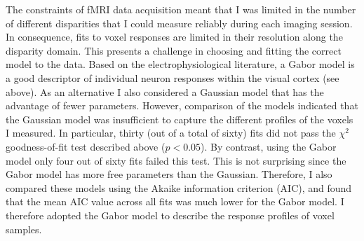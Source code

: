 The constraints of fMRI data acquisition meant that I was limited in the number of different disparities that I could measure reliably during each imaging session. In consequence, fits to voxel responses are limited in their resolution along the disparity domain. This presents a challenge in choosing and fitting the correct model to the data. Based on the electrophysiological literature, a Gabor model is a good descriptor of individual neuron responses within the visual cortex (see above). As an alternative I also considered a Gaussian model that has the advantage of fewer parameters. However, comparison of the models indicated that the Gaussian model was insufficient to capture the different profiles of the voxels I measured. In particular, thirty (out of a total of sixty) fits did not pass the $\chi^2$ goodness-of-fit test described above ($p<0.05$). By contrast, using the Gabor model only four out of sixty fits failed this test. This is not surprising since the Gabor model has more free parameters than the Gaussian. Therefore, I also compared these models using the Akaike information criterion (AIC), and found that the mean AIC value across all fits was much lower for the Gabor model. I therefore adopted the Gabor model to describe the response profiles of voxel samples.


